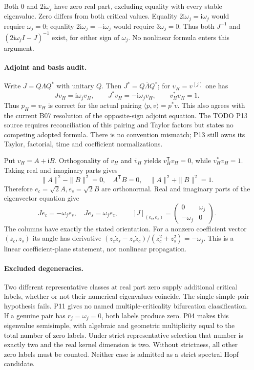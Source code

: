 \documentclass[11pt]{article}
\newcommand{\ii}{\mathrm i}
\begin{document}
Both $0$ and $2\ii\omega_j$ have zero real part, excluding equality
with every stable eigenvalue. Zero differs from both critical values.
Equality $2\ii\omega_j=\ii\omega_j$ would require $\omega_j=0$;
equality $2\ii\omega_j=-\ii\omega_j$ would require $3\omega_j=0$.
Thus both $J^{-1}$ and $(2\ii\omega_jI-J)^{-1}$ exist, for either
sign of $\omega_j$. No nonlinear formula enters this argument.

\paragraph{Adjoint and basis audit.}
Write $J=Q\Lambda Q^*$ with unitary $Q$. Then
$J^*=Q\overline\Lambda Q^*$; for $v_H=v^{(j)}$ one has
\[
 Jv_H=\ii\omega_jv_H,\qquad
 J^*v_H=-\ii\omega_jv_H,\qquad v_H^*v_H=1.
\]
Thus $p_H=v_H$ is correct for the actual pairing $\langle p,v\rangle=p^*v$.
This also agrees with the current B07 resolution of the opposite-sign
adjoint equation. The TODO P13 source requires reconciliation of this
pairing and Taylor factors but states no competing adopted formula.
There is no convention mismatch; P13 still owns its Taylor, factorial,
time and coefficient normalizations.

Put $v_H=A+\ii B$. Orthogonality of $v_H$ and $\overline v_H$
yields $v_H^{\mathsf T}v_H=0$, while $v_H^*v_H=1$. Taking real
and imaginary parts gives
\[
 \|A\|^2-\|B\|^2=0,\quad A^{\mathsf T}B=0,\quad
 \|A\|^2+\|B\|^2=1.
\]
Therefore $e_c=\sqrt2 A,e_s=\sqrt2 B$ are orthonormal. Real and
imaginary parts of the eigenvector equation give
\[
 Je_c=-\omega_j e_s,\quad Je_s=\omega_j e_c,
 \qquad [J]_{(e_c,e_s)}=
 \begin{pmatrix}0&\omega_j\\-\omega_j&0\end{pmatrix}.
\]
The columns have exactly the stated orientation. For a nonzero coefficient
vector $(z_c,z_s)$ its angle has derivative
$(z_c\dot z_s-z_s\dot z_c)/(z_c^2+z_s^2)=-\omega_j$.
This is a linear coefficient-plane statement, not nonlinear propagation.

\paragraph{Excluded degeneracies.}
Two different representative classes at real part zero supply additional
critical labels, whether or not their numerical eigenvalues coincide.
The single-simple-pair hypothesis fails. P11 gives no named
multiple-criticality bifurcation classification. If a genuine pair has
$r_j=\omega_j=0$, both labels produce zero. P04 makes this eigenvalue
semisimple, with algebraic and geometric multiplicity equal to the total
number of zero labels. Under strict representative selection that number
is exactly two and the real kernel dimension is two. Without strictness,
all other zero labels must be counted. Neither case is admitted as a
strict spectral Hopf candidate.
\end{document}
